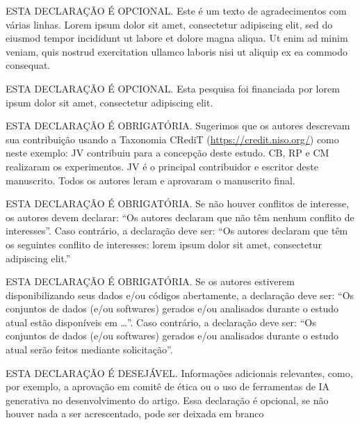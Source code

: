 \documentclass[portuguese]{sbc2025}%
\begin{document}
\begin{declarations}

\begin{acknowledgements}
ESTA DECLARAÇÃO É OPCIONAL. Este é um texto de agradecimentos com várias linhas. Lorem ipsum dolor sit amet, consectetur adipiscing elit, sed do eiusmod tempor incididunt ut labore et dolore magna aliqua. Ut enim ad minim veniam, quis nostrud exercitation ullamco laboris nisi ut aliquip ex ea commodo consequat.
\end{acknowledgements}

\begin{funding}
ESTA DECLARAÇÃO É OPCIONAL. Esta pesquisa foi financiada por lorem ipsum dolor sit amet, consectetur adipiscing elit.
\end{funding}

\begin{contributions}
ESTA DECLARAÇÃO É OBRIGATÓRIA. Sugerimos que os autores descrevam sua contribuição usando a Taxonomia CRediT (\href{https://credit.niso.org/}{https://credit.niso.org/}) como neste exemplo: JV contribuiu para a concepção deste estudo. CB, RP e CM realizaram os experimentos. JV é o principal contribuidor e escritor deste manuscrito. Todos os autores leram e aprovaram o manuscrito final. 
\end{contributions}

\begin{interests}
ESTA DECLARAÇÃO É OBRIGATÓRIA. Se não houver conflitos de interesse, os autores devem declarar: ``Os autores declaram que não têm nenhum conflito de interesses''. Caso contrário, a declaração deve ser: ``Os autores declaram que têm os seguintes conflito de interesses: lorem ipsum dolor sit amet, consectetur adipiscing elit.''
\end{interests}

\begin{materials}
ESTA DECLARAÇÃO É OBRIGATÓRIA. 
  Se os autores estiverem disponibilizando seus dados e/ou códigos
  abertamente, a declaração deve ser: ``Os conjuntos de dados (e/ou
  softwares) gerados e/ou analisados durante o estudo atual estão
  disponíveis em \ldots''. Caso contrário, a declaração deve ser: ``Os
  conjuntos de dados (e/ou softwares) gerados e/ou analisados durante
  o estudo atual serão feitos mediante solicitação''.
\end{materials}

\begin{furtherinformation}
ESTA DECLARAÇÃO É DESEJÁVEL. Informações adicionais relevantes, como, por exemplo, a aprovação em comitê de ética ou o uso de ferramentas de IA generativa no desenvolvimento do artigo. Essa declaração é opcional, se não houver nada a ser acrescentado, pode ser deixada em branco
\end{furtherinformation}
\end{declarations}





\end{document}
